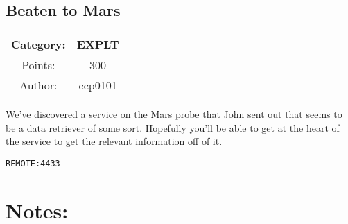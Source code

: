 \begin{center}
\section*{Beaten to Mars}
{\large
\begin{tabular}{| c c |}
\hline
Category: & EXPLT\\\hline
Points: & 300\\\hline
Author: & ccp0101\\\hline
\end{tabular}
}
\end{center}
\vspace{0.5in}

{\large
We've discovered a service on the Mars probe that John sent out that seems to be a data retriever of some sort. Hopefully you'll be able to get at the heart of the service to get the relevant information off of it.
}
\vspace{0.25in}
\begin{center}
  {\Large\tt REMOTE:4433}
\end{center}

\vspace{0.25in}
\section*{Notes:}
